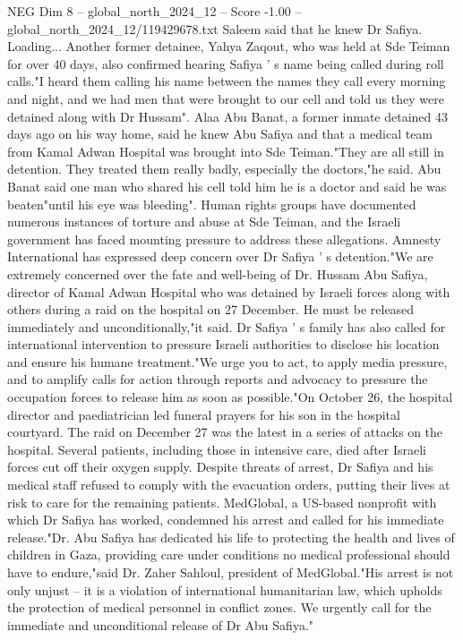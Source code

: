 \begin{textsample}{NEG Dim 8 – global\_north\_2024\_12 – Score -1.00 – global\_north\_2024\_12/119429678.txt}
Saleem said that he knew Dr Safiya.
Loading...
Another former detainee, Yahya Zaqout, who was held at Sde Teiman for over 40 days, also confirmed hearing Safiya ' s name being called during roll calls."I heard them calling his name between the names they call every morning and night, and we had men that were brought to our cell and told us they were detained along with Dr Hussam".
Alaa Abu Banat, a former inmate detained 43 days ago on his way home, said he knew Abu Safiya and that a medical team from Kamal Adwan Hospital was brought into Sde Teiman."They are all still in detention.
They treated them really badly, especially the doctors,"he said.
Abu Banat said one man who shared his cell told him he is a doctor and said he was beaten"until his eye was bleeding".
Human rights groups have documented numerous instances of torture and abuse at Sde Teiman, and the Israeli government has faced mounting pressure to address these allegations.
Amnesty International has expressed deep concern over Dr Safiya ' s detention."We are extremely concerned over the fate and well-being of Dr.
Hussam Abu Safiya, director of Kamal Adwan Hospital who was detained by Israeli forces along with others during a raid on the hospital on 27 December.
He must be released immediately and unconditionally,"it said.
Dr Safiya ' s family has also called for international intervention to pressure Israeli authorities to disclose his location and ensure his humane treatment."We urge you to act, to apply media pressure, and to amplify calls for action through reports and advocacy to pressure the occupation forces to release him as soon as possible."On October 26, the hospital director and paediatrician led funeral prayers for his son in the hospital courtyard.
The raid on December 27 was the latest in a series of attacks on the hospital.
Several patients, including those in intensive care, died after Israeli forces cut off their oxygen supply.
Despite threats of arrest, Dr Safiya and his medical staff refused to comply with the evacuation orders, putting their lives at risk to care for the remaining patients.
MedGlobal, a US-based nonprofit with which Dr Safiya has worked, condemned his arrest and called for his immediate release."Dr.
Abu Safiya has dedicated his life to protecting the health and lives of children in Gaza, providing care under conditions no medical professional should have to endure,"said Dr.
Zaher Sahloul, president of MedGlobal."His arrest is not only unjust -- it is a violation of international humanitarian law, which upholds the protection of medical personnel in conflict zones.
We urgently call for the immediate and unconditional release of Dr Abu Safiya."

\end{textsample}
